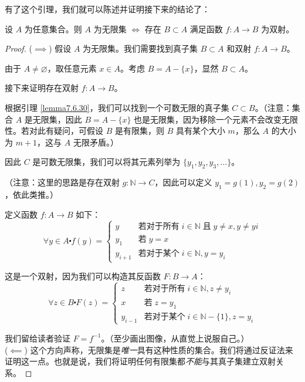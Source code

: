 有了这个引理，我们就可以陈述并证明接下来的结论了：

\begin{theorem}
    设 $A$ 为任意集合。则 $A$ 为无限集 $\iff$ 存在 $B \subset A$ 满足函数 $f : A \to B$ 为双射。
\end{theorem}

\begin{proof}
    ($\implies$) 假设 $A$ 为无限集。我们需要找到真子集 $B \subset A$ 和双射 $f : A \to B$。

    由于 $A \ne \varnothing$，取任意元素 $x \in A$。考虑 $B = A - \{x\}$，显然 $B \subset A$。

    接下来证明存在双射 $f : A \to B$。

    根据引理 \ref{lemma7.6.30}，我们可以找到一个可数无限的真子集 $C \subset B$。（注意：集合 $A$ 是无限集，因此 $B = A - \{x\}$ 也是无限集，因为移除一个元素不会改变无限性。若对此有疑问，可假设 $B$ 是有限集，则 $B$ 具有某个大小 $m$，那么 $A$ 的大小为 $m+1$，这与 $A$ 无限矛盾。）

    因此 $C$ 是可数无限集，我们可以将其元素列举为 $\{y_1, y_2, y_3, \dots\}$。

    （注意：这里的思路是存在双射 $g : \mathbb{N} \to C$，因此可以定义 $y_1 = g(1), y_2 = g(2)$，依此类推。）

    定义函数 $f : A \to B$ 如下：
    \[\forall y \in A \centerdot f(y) = \begin{cases}
            y       & \text{若对于所有}\; i \in \mathbb{N} \;\text{且}\; y \ne x, y \ne yi \\
            y_1     & \text{若}\; y = x                                               \\
            y_{i+1} & \text{若对于某个}\; i \in \mathbb{N}, y = y_i
        \end{cases}\]

    这是一个双射，因为我们可以构造其反函数 $F : B \to A$：
    \[\forall z \in B \centerdot F(z) = \begin{cases}
            z & \text{若对于所有}\; i \in \mathbb{N}, z \ne y_i \\
            x & \text{若}\; z = y_1                \\
            y_{i-1} &\text{若对于某个}\; i \in \mathbb{N}-\{1\}, z = y_i
        \end{cases}\]
        
    我们留给读者验证 $F = f^{-1}$。（至少画出图像，从直觉上说服自己。）\\

    ($\impliedby$) 这个方向声称，无限集是\emph{唯一}具有这种性质的集合。我们将通过反证法来证明这一点。也就是说，我们将证明任何有限集都\emph{不能}与其真子集建立双射关系。


\end{proof}
